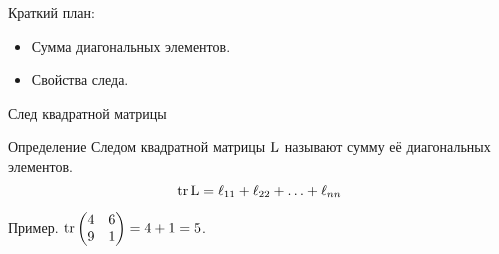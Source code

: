 
\begin{frame} %


\end{frame}



\begin{frame}{Краткий план:}
  \begin{itemize}[<+->] 
    \item Сумма диагональных элементов.
    \item Свойства следа.
  \end{itemize}

\end{frame}


\begin{frame}{След квадратной матрицы}
    \begin{block}{Определение}
        \alert{Следом квадратной матрицы} $\operatorname{L}$ называют сумму её диагональных элементов. 
        \[
            \trace \LL = \ell_{11} + \ell_{22} + \ldots + \ell_{nn}
        \]
    \end{block}

    \pause
    Пример. $\trace \begin{pmatrix}
        4 & 6 \\
        9 & 1
    \end{pmatrix} = 4 + 1 = 5$.

\end{frame}





